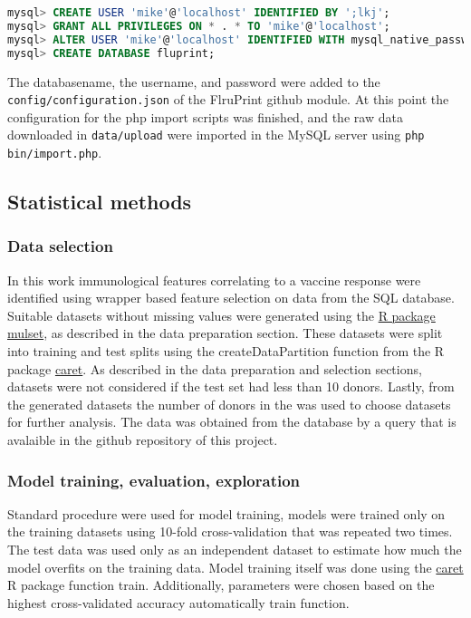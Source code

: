 \begin{lstlisting}[language=sql, caption=Adding user and database to sql server, label={lst:addUser}]
mysql> CREATE USER 'mike'@'localhost' IDENTIFIED BY ';lkj';
mysql> GRANT ALL PRIVILEGES ON * . * TO 'mike'@'localhost';
mysql> ALTER USER 'mike'@'localhost' IDENTIFIED WITH mysql_native_password BY 'mike';
mysql> CREATE DATABASE fluprint;
\end{lstlisting}

The databasename, the username, and password were added to the
\lstinline{config/configuration.json} of the FlruPrint github module. At this
point the configuration for the php import scripts was finished, and the raw
data downloaded in \lstinline{data/upload} were imported in the MySQL server
using \lstinline{php bin/import.php}.

\subsection{Statistical methods}

\subsubsection{Data selection}

In this work immunological features correlating to a vaccine response were identified using wrapper based feature selection on data from the \flup SQL database.
Suitable datasets without missing values were generated using the \href{https://cran.r-project.org/web/packages/mulset/index.html}{R package mulset}, as described in the data preparation section.
These datasets were split into training and test splits using the createDataPartition function from the R package \href{https://topepo.github.io/caret/}{caret}.
As described in the data preparation and selection sections, datasets were not considered if the test set had less than 10 donors.
Lastly, from the generated datasets the number of donors in the \secondvis was used to choose datasets for further analysis. The \secondvis data was obtained from the database by a query that is avalaible in the github repository of this project.

\subsubsection{Model training, evaluation, exploration}

Standard procedure were used for model training, models were trained only on the training datasets using 10-fold cross-validation that was repeated two times.
The test data was used only as an independent dataset to estimate how much the model overfits on the training data.
Model training itself was done using the \href{https://topepo.github.io/caret/}{caret} R package function train.
Additionally, parameters were chosen based on the highest cross-validated accuracy automatically train function.


